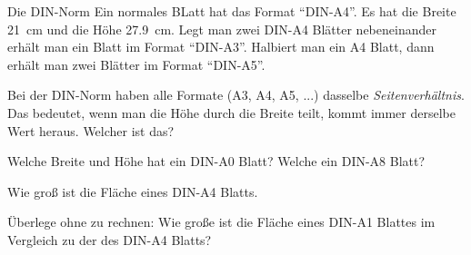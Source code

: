 \documentclass[12pt,a5paper,landscape]{scrartcl}
\begin{document}
	\begin{karte3}{Die DIN-Norm}
		Ein normales BLatt hat das Format \enquote{DIN-A4}. Es hat die Breite \SI{21}{\centi\meter} und die Höhe \SI{27,9}{\centi\meter}. Legt man zwei DIN-A4 Blätter nebeneinander erhält man ein Blatt im Format \enquote{DIN-A3}. Halbiert man ein A4 Blatt, dann erhält man zwei Blätter im Format \enquote{DIN-A5}.
		
		\begin{enumeratea}
			\item Bei der DIN-Norm haben alle Formate (A3, A4, A5, ...) dasselbe \emph{Seitenverhältnis}. Das bedeutet, wenn man die Höhe durch die Breite teilt, kommt immer derselbe Wert heraus. Welcher ist das?
			\item Welche Breite und Höhe hat ein DIN-A0 Blatt? Welche ein DIN-A8 Blatt?
			\item Wie groß ist die Fläche eines DIN-A4 Blatts. 
			\item Überlege ohne zu rechnen: Wie große ist die Fläche eines DIN-A1 Blattes im Vergleich zu der des DIN-A4 Blatts?
		\end{enumeratea}
	\end{karte3}
	
	\begin{loesungskarte}
	\end{loesungskarte}
	
\end{document}
